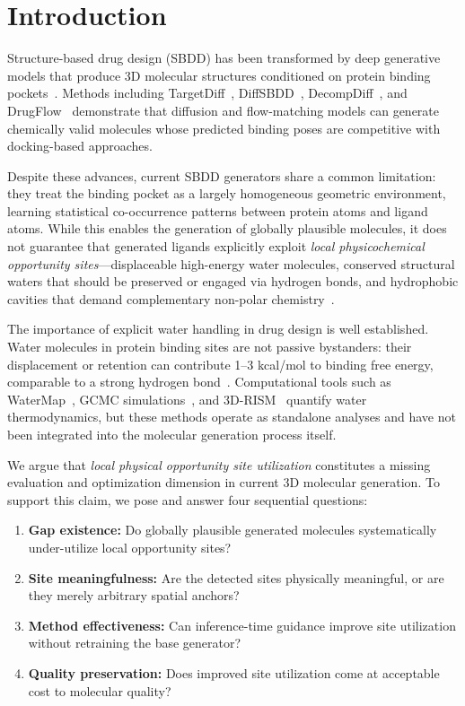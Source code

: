 \documentclass[journal=jcisd,manuscript=article]{achemso}
\begin{document}
\section{Introduction}

Structure-based drug design (SBDD) has been transformed by deep generative models
that produce 3D molecular structures conditioned on protein binding pockets~\cite{RN1,RN2,RN3}.
Methods including TargetDiff~\cite{RN1}, DiffSBDD~\cite{RN2}, DecompDiff~\cite{RN3},
and DrugFlow~\cite{RN4} demonstrate that diffusion and flow-matching models can generate
chemically valid molecules whose predicted binding poses are competitive with docking-based
approaches.

Despite these advances, current SBDD generators share a common limitation: they
treat the binding pocket as a largely homogeneous geometric environment, learning
statistical co-occurrence patterns between protein atoms and ligand atoms. While
this enables the generation of globally plausible molecules, it does not guarantee
that generated ligands explicitly exploit \emph{local physicochemical opportunity
sites}---displaceable high-energy water molecules, conserved structural waters that
should be preserved or engaged via hydrogen bonds, and hydrophobic cavities that
demand complementary non-polar chemistry~\cite{RN5,RN6,RN7}.

The importance of explicit water handling in drug design is well established.
Water molecules in protein binding sites are not passive bystanders: their
displacement or retention can contribute 1--3 kcal/mol to binding free energy,
comparable to a strong hydrogen bond~\cite{RN8,RN9}. Computational tools such
as WaterMap~\cite{RN10}, GCMC simulations~\cite{RN11}, and 3D-RISM~\cite{RN12}
quantify water thermodynamics, but these methods operate as standalone analyses
and have not been integrated into the molecular generation process itself.

We argue that \emph{local physical opportunity site utilization} constitutes a
missing evaluation and optimization dimension in current 3D molecular generation.
To support this claim, we pose and answer four sequential questions:

\begin{enumerate}
    \item \textbf{Gap existence:} Do globally plausible generated molecules
          systematically under-utilize local opportunity sites?
    \item \textbf{Site meaningfulness:} Are the detected sites physically
          meaningful, or are they merely arbitrary spatial anchors?
    \item \textbf{Method effectiveness:} Can inference-time guidance improve
          site utilization without retraining the base generator?
    \item \textbf{Quality preservation:} Does improved site utilization come
          at acceptable cost to molecular quality?
\end{enumerate}
\end{document}
